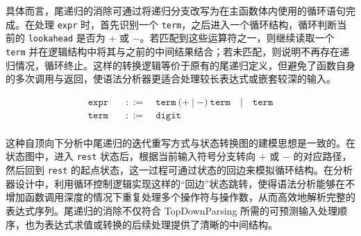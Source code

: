 \documentclass[a4paper, twoside, utf8]{ctexart}
\begin{document}
    具体而言，尾递归的消除可通过将递归分支改写为在主函数体内使用的循环语句完成。在处理 \verb|expr| 时，首先识别一个 \verb|term|，之后进入一个循环结构，循环判断当前的 \verb|lookahead| 是否为 $+$ 或 $-$。若匹配到这些运算符之一，则继续读取一个 \verb|term| 并在逻辑结构中将其与之前的中间结果结合；若未匹配，则说明不再存在递归情况，循环终止。这样的转换逻辑等价于原有的尾递归定义，但避免了函数自身的多次调用与返回，使语法分析器更适合处理较长表达式或嵌套较深的输入。

    \begin{equation}
        \begin{aligned}
            \texttt{expr} \quad & ::= \quad \texttt{term} \ (+ \ | \ -) \ \texttt{term} \quad | \quad \texttt{term} \\
            \texttt{term} \quad & ::=  \quad \texttt{digit} \\
        \end{aligned}
    \end{equation}
    \vspace{.5em}
    
    这种自顶向下分析中尾递归的迭代重写方式与状态转换图的建模思想是一致的。在状态图中，进入 \verb|rest| 状态后，根据当前输入符号分支转向 $+$ 或 $-$ 的对应路径，然后回到 \verb|rest| 的起点状态，这一过程可通过状态的回边来模拟循环结构。在分析器设计中，利用循环控制逻辑实现这样的“回边”状态跳转，使得语法分析能够在不增加函数调用深度的情况下重复处理多个操作符与操作数，从而高效地解析完整的表达式序列。尾递归的消除不仅符合 TopDownParsing 所需的可预测输入处理顺序，也为表达式求值或转换的后续处理提供了清晰的中间结构。
\end{document}
